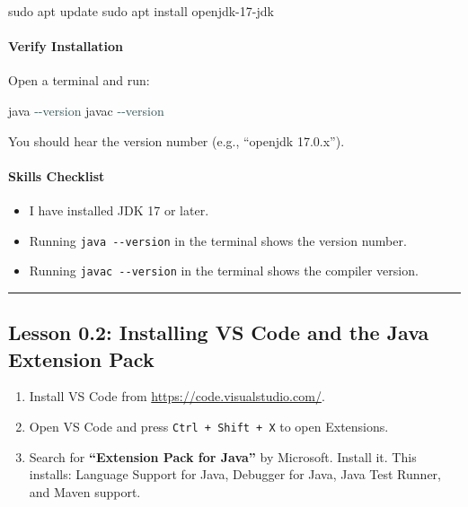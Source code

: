 \documentclass[
  justified,
  openright,
]{tufte-book}
\let\subsubsection\paragraph
\let\paragraph\paragraph
\newcommand{\AttributeTok}[1]{\textcolor{DarkSlateGray}{#1}}
\newcommand{\ExtensionTok}[1]{#1}
\newcommand{\FunctionTok}[1]{\textcolor{BrandBlue}{#1}}
\newcommand{\NormalTok}[1]{#1}
\newenvironment{Shaded}{%
  \begin{snugshade}
}{%
  \end{snugshade}
}
\let\subsubsection\paragraph
\let\paragraph\paragraph
\providecommand{\tightlist}{%
  \setlength{\itemsep}{0pt}\setlength{\parskip}{0pt}}
\begin{document}
\begin{Shaded}
\begin{Highlighting}[]
\FunctionTok{sudo}\NormalTok{ apt update}
\FunctionTok{sudo}\NormalTok{ apt install openjdk{-}17{-}jdk}
\end{Highlighting}
\end{Shaded}

\subsubsection{Verify Installation}\label{verify-installation}

Open a terminal and run:

\begin{Shaded}
\begin{Highlighting}[]
\ExtensionTok{java} \AttributeTok{{-}{-}version}
\ExtensionTok{javac} \AttributeTok{{-}{-}version}
\end{Highlighting}
\end{Shaded}

You should hear the version number (e.g., ``openjdk 17.0.x'').

\subsubsection{Skills Checklist}\label{skills-checklist}

\begin{itemize}
\tightlist
\item[$\square$]
  I have installed JDK 17 or later.
\item[$\square$]
  Running \texttt{java\ -\/-version} in the terminal shows the version
  number.
\item[$\square$]
  Running \texttt{javac\ -\/-version} in the terminal shows the compiler
  version.
\end{itemize}

\begin{center}\rule{0.5\linewidth}{0.5pt}\end{center}

\subsection{Lesson 0.2: Installing VS Code and the Java Extension
Pack}\label{lesson-0.2-installing-vs-code-and-the-java-extension-pack}

\begin{enumerate}
\def\labelenumi{\arabic{enumi}.}
\tightlist
\item
  Install VS Code from \url{https://code.visualstudio.com/}.
\item
  Open VS Code and press \texttt{Ctrl\ +\ Shift\ +\ X} to open
  Extensions.
\item
  Search for \textbf{``Extension Pack for Java''} by Microsoft. Install
  it. This installs: Language Support for Java, Debugger for Java, Java
  Test Runner, and Maven support.
\end{enumerate}
\end{document}
